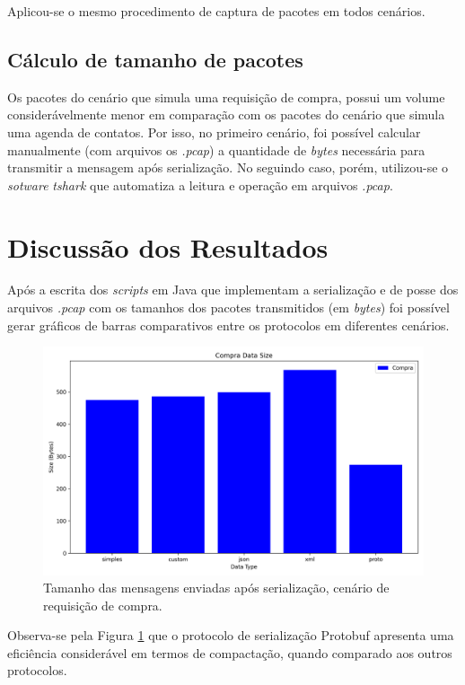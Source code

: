 \documentclass{article}
\begin{document}
Aplicou-se o mesmo procedimento de captura de pacotes em todos cenários.

\subsection{Cálculo de tamanho de pacotes}
Os pacotes do cenário que simula uma requisição de compra, possui um volume considerávelmente menor em comparação com os
pacotes do cenário que simula uma agenda de contatos. Por isso, no primeiro cenário, foi possível calcular manualmente (com arquivos os \textit{.pcap}) a quantidade de \textit{bytes} necessária para transmitir a mensagem após serialização. No seguindo caso, porém, utilizou-se o \textit{sotware} \textit{tshark} que automatiza a leitura e operação em arquivos \textit{.pcap}.



\section{Discussão dos Resultados}

Após a escrita dos \textit{scripts} em Java que implementam a serialização e de posse dos arquivos \textit{.pcap} com os tamanhos dos pacotes transmitidos (em \textit{bytes}) foi possível
gerar gráficos de barras comparativos entre os protocolos em diferentes cenários.

\begin{figure}[H]
    \centering
    \includegraphics[width=\textwidth]{imgs/compra_data_size.png}
    \caption{Tamanho das mensagens enviadas após serialização, cenário de requisição de compra.}
    \label{fig:compra}
\end{figure}

Observa-se pela Figura \ref{fig:compra} que o protocolo de serialização Protobuf apresenta uma eficiência considerável em termos de compactação, quando comparado aos outros protocolos.
\end{document}
